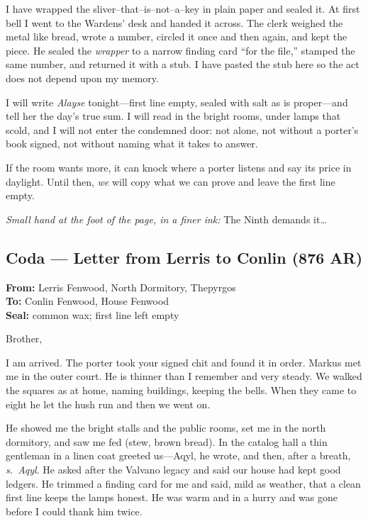 \documentclass[11pt]{article}
\numberwithin{equation}{section} %
\theoremstyle{plain} %
\theoremstyle{definition} %
\theoremstyle{remark} %
\begin{document}
I have wrapped the sliver–that–is–not–a–key in plain paper and sealed it. At first bell I went to the Wardens’ desk and handed it across. The clerk weighed the metal like bread, wrote a number, circled it once and then again, and kept the piece. He sealed the \emph{wrapper} to a narrow finding card “for the file,” stamped the same number, and returned it with a stub. I have pasted the stub here so the act does not depend upon my memory.

I will write \textit{Alayse} tonight—first line empty, sealed with salt as is proper—and tell her the day’s true sum. I will read in the bright rooms, under lamps that scold, and I will not enter the condemned door: not alone, not without a porter’s book signed, not without naming what it takes to answer.

If the room wants more, it can knock where a porter listens and say its price in daylight. Until then, \textit{we} will copy what we can prove and leave the first line empty.

\medskip
\noindent\textit{Small hand at the foot of the page, in a finer ink:} The Ninth demands it\ldots{}

\subsection*{Coda — Letter from Lerris to Conlin (876 AR)}

\noindent\textbf{From:} Lerris Fenwood, North Dormitory, Thepyrgos \\
\textbf{To:} Conlin Fenwood, House Fenwood \\
\textbf{Seal:} common wax; first line left empty

\medskip
\noindent Brother,

I am arrived. The porter took your signed chit and found it in order. Markus met me in the outer court. He is thinner than I remember and very steady. We walked the squares as at home, naming buildings, keeping the bells. When they came to eight he let the hush run and then we went on.

He showed me the bright stalls and the public rooms, set me in the north dormitory, and saw me fed (stew, brown bread). In the catalog hall a thin gentleman in a linen coat greeted us—Aqyl, he wrote, and then, after a breath, \emph{s.\ Aqyl}. He asked after the Valvano legacy and said our house had kept good ledgers. He trimmed a finding card for me and said, mild as weather, that a clean first line keeps the lamps honest. He was warm and in a hurry and was gone before I could thank him twice.
\end{document}

